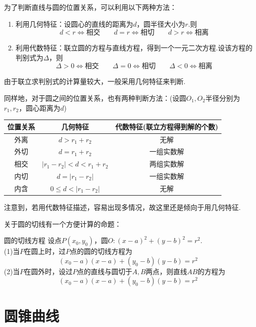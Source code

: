 \documentclass[lang=cn, zihao=4.5]{elegantbook}
\begin{document}
为了判断直线与圆的位置关系，可以利用以下两种方法：

\begin{enumerate}
	\item 利用几何特征：设圆心的直线的距离为$d$，圆半径大小为$r$.则$$d<r \Longleftrightarrow \textit{相交} \qquad d=r \Longleftrightarrow \textit{相切} \qquad d>r \Longleftrightarrow \textit{相离}$$
	\item 利用代数特征：联立圆的方程与直线方程，得到一个一元二次方程.设该方程的判别式为$\Delta$，则$$\Delta > 0 \Longleftrightarrow \textit{相交} \qquad \Delta = 0 \Longleftrightarrow \textit{相切} \qquad \Delta < 0 \Longleftrightarrow \textit{相离}$$
\end{enumerate}

由于联立求判别式的计算量较大，一般采用几何特征来判断.

同样地，对于圆之间的位置关系，也有两种判断方法：(设圆$O_1,O_2$半径分别为$r_1,r_2$，圆心距离为$d$)

\begin{table}[h]
	\centering
	\renewcommand\arraystretch{1.5}
	\begin{tabular}{c|cc}
		\toprule
		位置关系&几何特征&代数特征(联立方程得到解的个数) \\
		\midrule
		外离 & $d>r_1+r_2$ & 无解 \\
		外切 & $d=r_1+r_2$ & 一组实数解 \\
		相交 & $|r_1-r_2|<d<r_1+r_2$ & 两组实数解 \\
		内切 & $d=|r_1-r_2|$ & 一组实数解 \\
		内含 & $0 \leq d < |r_1-r_2|$ & 无解 \\
		\bottomrule
	\end{tabular}
\end{table}

注意到，若用代数特征描述，容易出现多情况，故这里还是倾向于用几何特征.

关于圆的切线有一个方便计算的命题：

\begin{proposition}{圆的切线方程}
	设点$P(x_0,y_0)$，圆$O:(x-a)^2+(y-b)^2=r^2$. \\
	(1)当$P$在圆上时，过$P$点的圆的切线方程为$$(x_0-a)(x-a)+(y_0-b)(y-b)=r^2$$
	(2)当$P$在圆外时，设过$P$点的直线与圆切于$A,B$两点，则直线$AB$的方程为$$(x_0-a)(x-a)+(y_0-b)(y-b)=r^2$$
\end{proposition}

\section{圆锥曲线}
\end{document}
